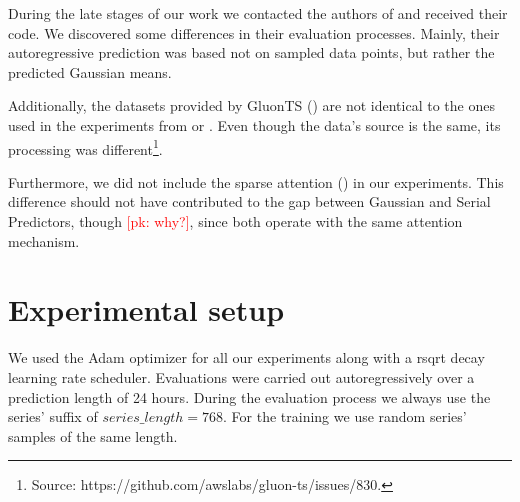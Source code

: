 \documentclass[en]{pracamgr}
\newcommand{\pk}[1]{\textcolor{red}{\small [pk: #1]}}
\begin{document}
	During the late stages of our work we contacted the authors of \cite{enhancing} and received their code. We discovered some differences in their evaluation processes. Mainly, their autoregressive prediction was based not on sampled data points, but rather the predicted Gaussian means.
	
	Additionally, the datasets provided by GluonTS (\cite{gluonts}) are not identical to the ones used in the experiments from \cite{enhancing} or \cite{deepar}. Even though the data's source is the same, its processing was different\footnote{Source: https://github.com/awslabs/gluon-ts/issues/830.}.
	
	Furthermore, we did not include the sparse attention (\cite{enhancing}) in our experiments. 
	This difference should not have contributed to the gap between Gaussian and Serial Predictors, though \pk{why?}, since both operate with the same attention mechanism. 
	
	
	\section{Experimental setup}
	
	We used the Adam optimizer for all our experiments along with a rsqrt decay learning rate scheduler.
	Evaluations were carried out autoregressively over a prediction length of 24 hours. During the evaluation process we always use the series' suffix of $series\_length = 768$. For the training we use random series' samples of the same length. 
	
\end{document}
